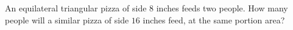 An equilateral triangular pizza of side $8$ inches feeds two people. How many people will a similar pizza of side $16$ inches feed, at the same portion area?
